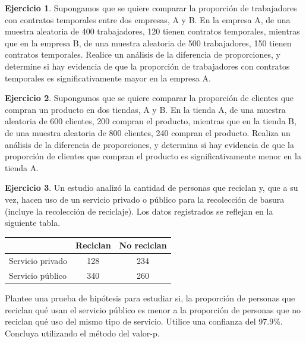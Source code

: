 \documentclass[
  11pt,
]{book}
\theoremstyle{definition}
\theoremstyle{definition}
\theoremstyle{definition}
\newtheorem{exercise}{Ejercicio}[chapter]
\theoremstyle{definition}
\theoremstyle{remark}
\begin{document}
\begin{exercise}
Supongamos que se quiere comparar la proporción de trabajadores con contratos temporales entre dos empresas, A y B. En la empresa A, de una muestra aleatoria de 400 trabajadores, 120 tienen contratos temporales, mientras que en la empresa B, de una muestra aleatoria de 500 trabajadores, 150 tienen contratos temporales. Realice un análisis de la diferencia de proporciones, y determine si hay evidencia de que la proporción de trabajadores con contratos temporales es significativamente mayor en la empresa A.
\end{exercise}

\begin{exercise}
Supongamos que se quiere comparar la proporción de clientes que compran un producto en dos tiendas, A y B. En la tienda A, de una muestra aleatoria de 600 clientes, 200 compran el producto, mientras que en la tienda B, de una muestra aleatoria de 800 clientes, 240 compran el producto. Realiza un análisis de la diferencia de proporciones, y determina si hay evidencia de que la proporción de clientes que compran el producto es significativamente menor en la tienda A.
\end{exercise}

\begin{exercise}
Un estudio analizó la cantidad de personas que reciclan y, que a su vez, hacen uso de un servicio privado o público para la recolección de basura (incluye la recolección de reciclaje). Los datos registrados se reflejan en la siguiente tabla.

\begin{table}[H]
\centering
\begin{tabular}[t]{lcc}
\toprule
  & Reciclan & No reciclan\\
\midrule
Servicio privado & 128 & 234\\
Servicio público & 340 & 260\\
\bottomrule
\end{tabular}
\end{table}

Plantee una prueba de hipótesis para estudiar si, la proporción de personas que reciclan qué usan el servicio público es menor a la proporción de personas que no reciclan qué uso del mismo tipo de servicio. Utilice una confianza del 97.9\%. Concluya utilizando el método del valor-p.~
\end{exercise}
\end{document}
